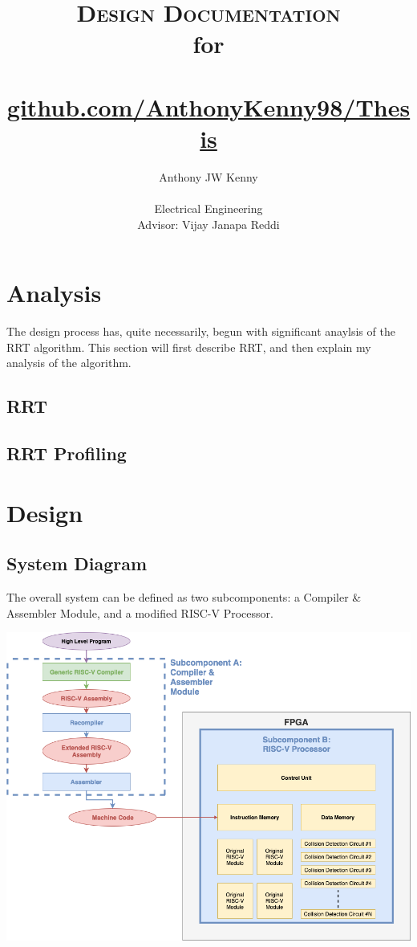 \documentclass[11pt, oneside]{article}      %
\title{\textsc{Design Documentation} \\ 
    \small{for} \\ 
    \Large{\masterThesisTitle} \\
    \small{\href{https://github.com/AnthonyKenny98/Thesis}{github.com/AnthonyKenny98/Thesis}}}
\author{Anthony JW Kenny \\ \\
        Electrical Engineering \\
        Advisor: Vijay Janapa Reddi}
\begin{document}
\maketitle







\section{Analysis}
The design process has, quite necessarily, begun with significant anaylsis of the RRT algorithm. This section will first describe RRT, and then explain my analysis of the algorithm.

\subsection{RRT}


\subsection{RRT Profiling}



\section{Design}

\subsection{System Diagram}
The overall system can be defined as two subcomponents: a Compiler \& Assembler Module, and a modified RISC-V Processor.

\begin{center}
\includegraphics[width=\linewidth]{../master/img/systemDiagramHorizontal.png}
\end{center}
\end{document}
